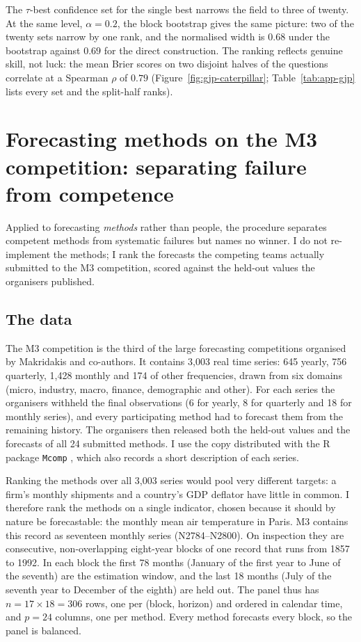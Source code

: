 The $\tau$-best confidence set for the single best narrows the field to three of twenty.
At the same level, $\alpha=0.2$, the block bootstrap gives the same picture: two of the
twenty sets narrow by one rank, and the normalised width is $0.68$ under the bootstrap
against $0.69$ for the direct construction. The ranking reflects genuine skill, not luck:
the mean Brier scores on two disjoint halves of the questions correlate at a Spearman
$\rho$ of $0.79$ (Figure~\ref{fig:gjp-caterpillar}; Table~\ref{tab:app-gjp} lists every
set and the split-half ranks).

\figGjpCaterpillar

\section{Forecasting methods on the M3 competition: separating failure from competence}
\label{sec:apps-mcomp}

Applied to forecasting \emph{methods} rather than people, the procedure separates
competent methods from systematic failures but names no winner. I do not re-implement
the methods; I rank the forecasts the competing teams actually submitted to the M3
competition, scored against the held-out values the organisers published.

\subsection{The data}
\label{sec:apps-mcomp-data}

The M3 competition \citep{makridakis2000m3} is the third of the large forecasting
competitions organised by Makridakis and co-authors. It contains 3{,}003 real time
series: 645 yearly, 756 quarterly, 1{,}428 monthly and 174 of other frequencies, drawn
from six domains (micro, industry, macro, finance, demographic and other). For each
series the organisers withheld the final observations (6 for yearly, 8 for quarterly and
18 for monthly series), and every participating method had to forecast them from the
remaining history. The organisers then released both the held-out values and the
forecasts of all 24 submitted methods. I use the copy distributed with the R package
\texttt{Mcomp} \citep{hyndman2018mcomp}, which also records a short description of each
series.

Ranking the methods over all 3{,}003 series would pool very different targets: a firm's
monthly shipments and a country's GDP deflator have little in common. I therefore rank
the methods on a single indicator, chosen because it should by nature be forecastable:
the monthly mean air temperature in Paris. M3 contains this record as seventeen monthly
series (N2784--N2800). On inspection they are consecutive, non-overlapping eight-year
blocks of one record that runs from 1857 to 1992. In each block the first 78 months
(January of the first year to June of the seventh) are the estimation window, and the
last 18 months (July of the seventh year to December of the eighth) are held out. The
panel thus has $n=17\times 18=306$ rows, one per (block, horizon) and ordered in calendar
time, and $p=24$ columns, one per method. Every method forecasts every block, so the
panel is balanced.

